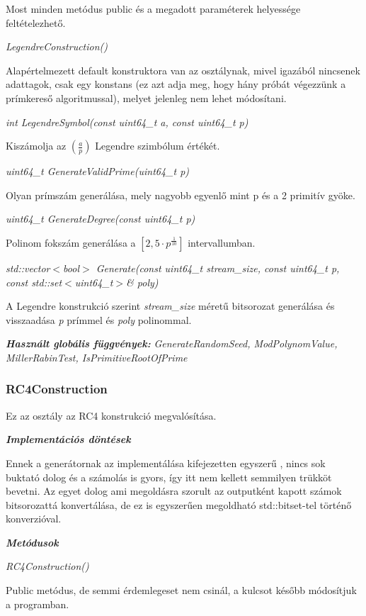 \documentclass[hidelinks, 12pt]{article}
\begin{document}
Most minden metódus public és a megadott paraméterek helyessége feltételezhető.

\textit{LegendreConstruction()}

Alapértelmezett default konstruktora van az osztálynak, mivel igazából nincsenek adattagok, csak egy konstans (ez azt adja meg, hogy hány próbát végezzünk a prímkereső algoritmussal), melyet jelenleg nem lehet módosítani.

\textit{int LegendreSymbol(const uint64\_t a, const uint64\_t p)}

Kiszámolja az $\left({\frac{a}{p}}\right)$ Legendre szimbólum értékét.

\textit{uint64\_t GenerateValidPrime(uint64\_t p)}

Olyan prímszám generálása, mely nagyobb egyenlő mint p és a 2 primitív gyöke.

\textit{uint64\_t GenerateDegree(const uint64\_t p)}

Polinom fokszám generálása a $[2, 5\cdot p^\frac{1}{10}]$ intervallumban.

\textit{std::vector$<$bool$>$ Generate(const uint64\_t stream\_size, const uint64\_t p, const std::set$<$uint64\_t$>$\& poly)}

A Legendre konstrukció szerint \textit{stream\_size} méretű bitsorozat generálása és visszaadása \textit{p} prímmel és \textit{poly} polinommal.

\textbf{\textit{Használt globális függvények: }}\textit{GenerateRandomSeed, ModPolynomValue, MillerRabinTest, IsPrimitiveRootOfPrime}

\subsubsection*{RC4Construction}
Ez az osztály az RC4 konstrukció megvalósítása.

\textbf{\textit{Implementációs döntések}}

Ennek a generátornak az implementálása kifejezetten egyszerű , nincs sok buktató dolog és a számolás is gyors, így itt nem kellett semmilyen trükköt bevetni. Az egyet dolog ami megoldásra szorult az outputként kapott számok bitsorozattá konvertálása, de ez is egyszerűen megoldható std::bitset-tel történő konverzióval.

\textbf{\textit{Metódusok}}

\textit{RC4Construction()}

Public metódus, de semmi érdemlegeset nem csinál, a kulcsot később módosítjuk a programban.
\end{document}
